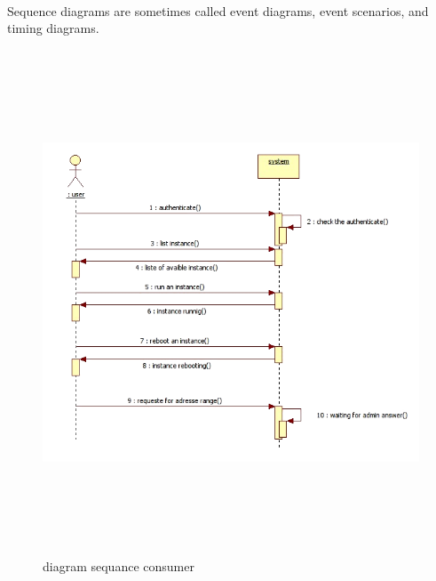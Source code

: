 \paragraph{}Sequence diagrams are sometimes called event diagrams, event scenarios, and timing diagrams.\par

\begin{figure}[!h]
 \center
 \includegraphics[width=18cm, height=15cm]{./images/design/sequenceuser}
 \caption{diagram sequance consumer}
\end{figure}

